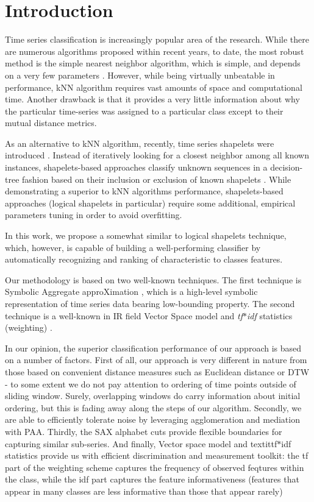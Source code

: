\documentclass{llncs}
\begin{document}
\section{Introduction}
%
Time series classification is increasingly popular area of the research.
While there are numerous algorithms proposed within recent years, to date,
the most robust method is the simple nearest neighbor algorithm, 
which is simple, and depends on a very few parameters \cite{ed}. 
However, while being virtually unbeatable in performance, kNN algorithm 
requires vast amounts of space and computational time. 
Another drawback is that it provides a very little information about why 
the particular time-series was assigned to a particular class except to 
their mutual distance metrics.

As an alternative to kNN algorithm, recently, time series shapelets were
introduced \cite{shapelet}. Instead of iteratively looking for a closest neighbor
among all known instances, shapelets-based approaches classify unknown 
sequences in a decision-tree fashion based on their inclusion or exclusion 
of known shapelets \cite{logical}. 
While demonstrating a superior to kNN algorithms performance,
shapelets-based approaches (logical shapelets in particular) require some
additional, empirical parameters tuning in order to avoid overfitting.

In this work, we propose a somewhat similar to logical shapelets technique,
which, however, is capable of building a well-performing classifier by 
automatically recognizing and ranking of characteristic to classes features.

Our methodology is based on two well-known techniques. The first technique is Symbolic
Aggregate approXimation \cite{sax}, which is a high-level symbolic representation
of time series data bearing low-bounding property. The second technique is a well-known
in IR field Vector Space model and \textit{tf$\ast$idf} statistics (weighting) \cite{tfidf}.

In our opinion, the superior classification performance of our approach is based on 
a number of factors. 
First of all, our approach is very different in nature from those 
based on convenient distance measures such as Euclidean distance or DTW - to some 
extent we do not pay attention to ordering of time points outside of sliding window. 
Surely, overlapping windows do carry information about initial ordering, but this 
is fading away along the steps of our algorithm.
Secondly, we are able to efficiently tolerate noise by leveraging agglomeration 
and mediation with PAA. 
Thirdly, the SAX alphabet cuts provide flexible boundaries for capturing similar 
sub-series. 
And finally, Vector space model and textit{tf$\ast$idf} statistics provide us 
with efficient discrimination and measurement toolkit: the tf part of the weighting scheme
captures the frequency of observed feqtures within the class, while the idf part 
captures the feature informativeness (features that appear in many classes 
are less informative than those that appear rarely)
\end{document}
